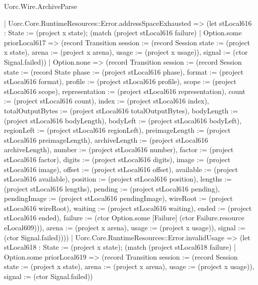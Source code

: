 \begin{lexlean}{Uorc.Wire.ArchiveParse}
\begin{semanticmodule}
{      | Uorc.Core.RuntimeResources::Error.addressSpaceExhausted => (let stLocal616 : State := (project x state); (match (project stLocal616 failure)
        | Option.some priorLocal617 => (record Transition {session := (record Session {state := (project x state), arena := (project x arena), usage := (project x usage)}), signal := (ctor Signal.failed)})
        | Option.none => (record Transition {session := (record Session {state := (record State {phase := (project stLocal616 phase), format := (project stLocal616 format), profile := (project stLocal616 profile), scope := (project stLocal616 scope), representation := (project stLocal616 representation), count := (project stLocal616 count), index := (project stLocal616 index), totalOutputBytes := (project stLocal616 totalOutputBytes), bodyLength := (project stLocal616 bodyLength), bodyLeft := (project stLocal616 bodyLeft), regionLeft := (project stLocal616 regionLeft), preimageLength := (project stLocal616 preimageLength), archiveLength := (project stLocal616 archiveLength), number := (project stLocal616 number), factor := (project stLocal616 factor), digits := (project stLocal616 digits), image := (project stLocal616 image), offset := (project stLocal616 offset), available := (project stLocal616 available), position := (project stLocal616 position), lengths := (project stLocal616 lengths), pending := (project stLocal616 pending), pendingImage := (project stLocal616 pendingImage), wireRoot := (project stLocal616 wireRoot), waiting := (project stLocal616 waiting), ended := (project stLocal616 ended), failure := (ctor Option.some [Failure] (ctor Failure.resource eLocal609))}), arena := (project x arena), usage := (project x usage)}), signal := (ctor Signal.failed)})))
      | Uorc.Core.RuntimeResources::Error.invalidUsage => (let stLocal618 : State := (project x state); (match (project stLocal618 failure)
        | Option.some priorLocal619 => (record Transition {session := (record Session {state := (project x state), arena := (project x arena), usage := (project x usage)}), signal := (ctor Signal.failed)})
}
\end{semanticmodule}
\end{lexlean}
